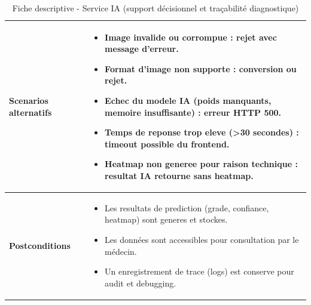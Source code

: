 \begin{table}[H]
\begin{tabular}{|p{5cm}|p{10cm}|}
\textbf{Scenarios alternatifs} &
\begin{itemize}
\item Image invalide ou corrompue : rejet avec message d'erreur.
\item Format d'image non supporte : conversion ou rejet.
\item Echec du modele IA (poids manquants, memoire insuffisante) : erreur HTTP 500.
\item Temps de reponse trop eleve (>30 secondes) : timeout possible du frontend.
\item Heatmap non generee pour raison technique : resultat IA retourne sans heatmap.
\end{itemize} \\ \hline

\textbf{Postconditions} &
\begin{itemize}
\item Les resultats de prediction (grade, confiance, heatmap) sont generes et stockes.
\item Les données sont accessibles pour consultation par le médecin.
\item Un enregistrement de trace (logs) est conserve pour audit et debugging.
\end{itemize} \\ \hline
\end{tabular}
\caption{Fiche descriptive - Service IA (support décisionnel et traçabilité diagnostique)}
\end{table}

